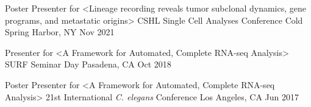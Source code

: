 

\begin{cventries}

  \cventry
    {Poster Presenter for <Lineage recording reveals tumor subclonal dynamics, gene
programs, and metastatic origins>} %
    {CSHL Single Cell Analyses Conference} %
    {Cold Spring Harbor, NY} %
    {Nov 2021} %
    {
      \begin{cvitems} %
      \end{cvitems}
    }

  \cventry
    {Presenter for <A Framework for Automated, Complete RNA-seq Analysis>} %
    {SURF Seminar Day} %
    {Pasadena, CA} %
    {Oct 2018} %
    {
      \begin{cvitems} %
      \end{cvitems}
    }


  \cventry
    {Poster Presenter for <A Framework for Automated, Complete RNA-seq Analysis>} %
    {21st International \textit{C. elegans} Conference} %
    {Los Angeles, CA} %
    {Jun 2017} %
    {
      \begin{cvitems} %
      \end{cvitems}
    }

\end{cventries}
